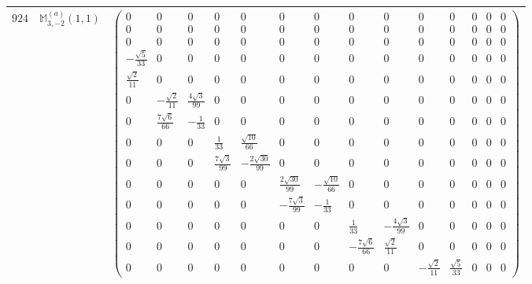 \documentclass[fleqn,8pt,landscape]{jsarticle}
\begin{document}
\begin{center}
\begin{longtable}{ccc}
$ 924 $ & $ \mathbb{M}_{3,-2}^{(a)}(1,1) $ & $ \begin{pmatrix} 0 & 0 & 0 & 0 & 0 & 0 & 0 & 0 & 0 & 0 & 0 & 0 & 0 & 0 \\ 0 & 0 & 0 & 0 & 0 & 0 & 0 & 0 & 0 & 0 & 0 & 0 & 0 & 0 \\ 0 & 0 & 0 & 0 & 0 & 0 & 0 & 0 & 0 & 0 & 0 & 0 & 0 & 0 \\ - \frac{\sqrt{5}}{33} & 0 & 0 & 0 & 0 & 0 & 0 & 0 & 0 & 0 & 0 & 0 & 0 & 0 \\ \frac{\sqrt{2}}{11} & 0 & 0 & 0 & 0 & 0 & 0 & 0 & 0 & 0 & 0 & 0 & 0 & 0 \\ 0 & - \frac{\sqrt{2}}{11} & \frac{4 \sqrt{3}}{99} & 0 & 0 & 0 & 0 & 0 & 0 & 0 & 0 & 0 & 0 & 0 \\ 0 & \frac{7 \sqrt{6}}{66} & - \frac{1}{33} & 0 & 0 & 0 & 0 & 0 & 0 & 0 & 0 & 0 & 0 & 0 \\ 0 & 0 & 0 & \frac{1}{33} & \frac{\sqrt{10}}{66} & 0 & 0 & 0 & 0 & 0 & 0 & 0 & 0 & 0 \\ 0 & 0 & 0 & \frac{7 \sqrt{3}}{99} & - \frac{2 \sqrt{30}}{99} & 0 & 0 & 0 & 0 & 0 & 0 & 0 & 0 & 0 \\ 0 & 0 & 0 & 0 & 0 & \frac{2 \sqrt{30}}{99} & - \frac{\sqrt{10}}{66} & 0 & 0 & 0 & 0 & 0 & 0 & 0 \\ 0 & 0 & 0 & 0 & 0 & - \frac{7 \sqrt{3}}{99} & - \frac{1}{33} & 0 & 0 & 0 & 0 & 0 & 0 & 0 \\ 0 & 0 & 0 & 0 & 0 & 0 & 0 & \frac{1}{33} & - \frac{4 \sqrt{3}}{99} & 0 & 0 & 0 & 0 & 0 \\ 0 & 0 & 0 & 0 & 0 & 0 & 0 & - \frac{7 \sqrt{6}}{66} & \frac{\sqrt{2}}{11} & 0 & 0 & 0 & 0 & 0 \\ 0 & 0 & 0 & 0 & 0 & 0 & 0 & 0 & 0 & - \frac{\sqrt{2}}{11} & \frac{\sqrt{5}}{33} & 0 & 0 & 0 \end{pmatrix} $ \\ \hline

\end{longtable}
\end{center}
\end{document}
